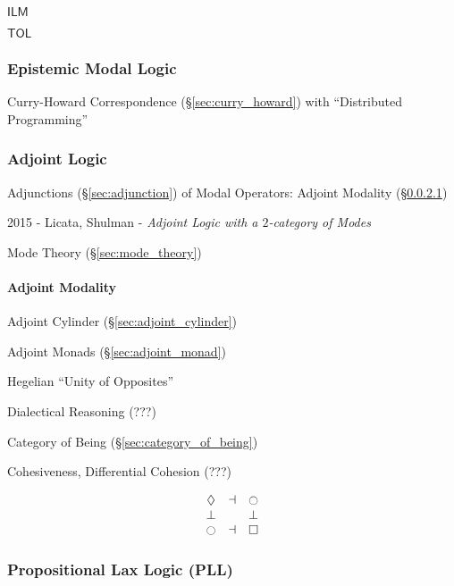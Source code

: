 $\mathsf{ILM}$

$\mathsf{TOL}$



\subsubsection{Epistemic Modal Logic}\label{sec:epistemic_logic}

Curry-Howard Correspondence (\S\ref{sec:curry_howard}) with
``Distributed Programming''



\subsubsection{Adjoint Logic}\label{sec:adjoint_logic}

Adjunctions (\S\ref{sec:adjunction}) of Modal Operators: Adjoint
Modality (\S\ref{sec:adjoint_modality})

2015 - Licata, Shulman - \emph{Adjoint Logic with a $2$-category of Modes}

\fist Mode Theory (\S\ref{sec:mode_theory})



\paragraph{Adjoint Modality}\label{sec:adjoint_modality}\hfill

Adjoint Cylinder (\S\ref{sec:adjoint_cylinder})

Adjoint Monads (\S\ref{sec:adjoint_monad})

Hegelian ``Unity of Opposites''

Dialectical Reasoning (???) %

Category of Being (\S\ref{sec:category_of_being})

Cohesiveness, Differential Cohesion (???)

\[
  \begin{matrix}
    \lozenge & \dashv & \ocircle \\
    \bot & \empty & \bot \\
    \ocircle & \dashv & \square
  \end{matrix}
\]



\subsubsection{Propositional Lax Logic (PLL)}\label{sec:propositional_lax_logic}

